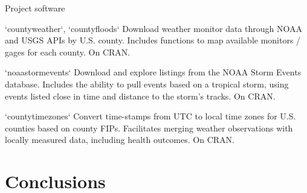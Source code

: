 \documentclass[ignorenonframetext,]{beamer}
\begin{document}
\begin{frame}{Project software}

\footnotesize

\begin{block}{`countyweather`, `countyfloods`}
Download weather monitor data through NOAA and USGS APIs by U.S. county. Includes functions to map available monitors / gages for each county. On CRAN.
\end{block}

\footnotesize

\begin{block}{`noaastormevents`}
Download and explore listings from the NOAA Storm Events database. Includes the ability to pull events based on a tropical storm, using events listed close in time and distance to the storm's tracks. On CRAN.
\end{block}

\footnotesize

\begin{block}{`countytimezones`}
Convert time-stamps from UTC to local time zones for U.S. counties based on county FIPs. Facilitates merging weather observations with locally measured data, including health outcomes. On CRAN.
\end{block}

\end{frame}

\section{Conclusions}\label{conclusions}
\end{document}
